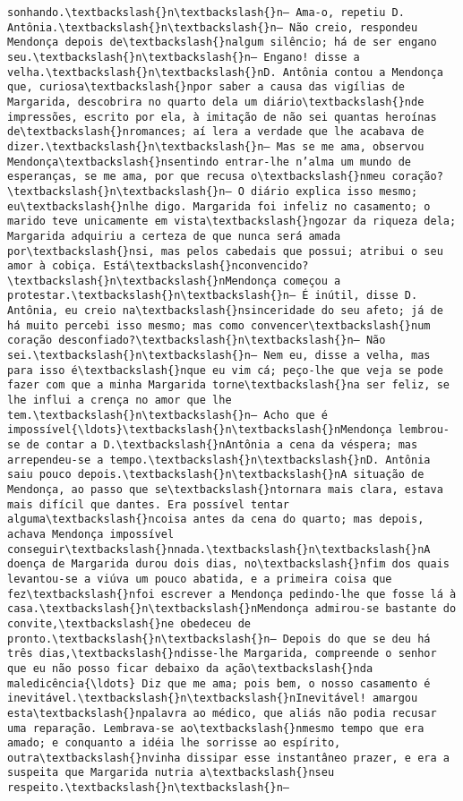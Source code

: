 \documentclass[11pt]{article}
\begin{document}
\begin{Verbatim}[commandchars=\\\{\}]
sonhando.\textbackslash{}n\textbackslash{}n— Ama-o, repetiu D. Antônia.\textbackslash{}n\textbackslash{}n— Não creio, respondeu Mendonça depois de\textbackslash{}nalgum silêncio; há de ser engano seu.\textbackslash{}n\textbackslash{}n— Engano! disse a velha.\textbackslash{}n\textbackslash{}nD. Antônia contou a Mendonça que, curiosa\textbackslash{}npor saber a causa das vigílias de Margarida, descobrira no quarto dela um diário\textbackslash{}nde impressões, escrito por ela, à imitação de não sei quantas heroínas de\textbackslash{}nromances; aí lera a verdade que lhe acabava de dizer.\textbackslash{}n\textbackslash{}n— Mas se me ama, observou Mendonça\textbackslash{}nsentindo entrar-lhe n’alma um mundo de esperanças, se me ama, por que recusa o\textbackslash{}nmeu coração?\textbackslash{}n\textbackslash{}n— O diário explica isso mesmo; eu\textbackslash{}nlhe digo. Margarida foi infeliz no casamento; o marido teve unicamente em vista\textbackslash{}ngozar da riqueza dela; Margarida adquiriu a certeza de que nunca será amada por\textbackslash{}nsi, mas pelos cabedais que possui; atribui o seu amor à cobiça. Está\textbackslash{}nconvencido?\textbackslash{}n\textbackslash{}nMendonça começou a protestar.\textbackslash{}n\textbackslash{}n— É inútil, disse D. Antônia, eu creio na\textbackslash{}nsinceridade do seu afeto; já de há muito percebi isso mesmo; mas como convencer\textbackslash{}num coração desconfiado?\textbackslash{}n\textbackslash{}n— Não sei.\textbackslash{}n\textbackslash{}n— Nem eu, disse a velha, mas para isso é\textbackslash{}nque eu vim cá; peço-lhe que veja se pode fazer com que a minha Margarida torne\textbackslash{}na ser feliz, se lhe influi a crença no amor que lhe tem.\textbackslash{}n\textbackslash{}n— Acho que é impossível{\ldots}\textbackslash{}n\textbackslash{}nMendonça lembrou-se de contar a D.\textbackslash{}nAntônia a cena da véspera; mas arrependeu-se a tempo.\textbackslash{}n\textbackslash{}nD. Antônia saiu pouco depois.\textbackslash{}n\textbackslash{}nA situação de Mendonça, ao passo que se\textbackslash{}ntornara mais clara, estava mais difícil que dantes. Era possível tentar alguma\textbackslash{}ncoisa antes da cena do quarto; mas depois, achava Mendonça impossível conseguir\textbackslash{}nnada.\textbackslash{}n\textbackslash{}nA doença de Margarida durou dois dias, no\textbackslash{}nfim dos quais levantou-se a viúva um pouco abatida, e a primeira coisa que fez\textbackslash{}nfoi escrever a Mendonça pedindo-lhe que fosse lá à casa.\textbackslash{}n\textbackslash{}nMendonça admirou-se bastante do convite,\textbackslash{}ne obedeceu de pronto.\textbackslash{}n\textbackslash{}n— Depois do que se deu há três dias,\textbackslash{}ndisse-lhe Margarida, compreende o senhor que eu não posso ficar debaixo da ação\textbackslash{}nda maledicência{\ldots} Diz que me ama; pois bem, o nosso casamento é inevitável.\textbackslash{}n\textbackslash{}nInevitável! amargou esta\textbackslash{}npalavra ao médico, que aliás não podia recusar uma reparação. Lembrava-se ao\textbackslash{}nmesmo tempo que era amado; e conquanto a idéia lhe sorrisse ao espírito, outra\textbackslash{}nvinha dissipar esse instantâneo prazer, e era a suspeita que Margarida nutria a\textbackslash{}nseu respeito.\textbackslash{}n\textbackslash{}n— 
\end{Verbatim}
\end{document}
